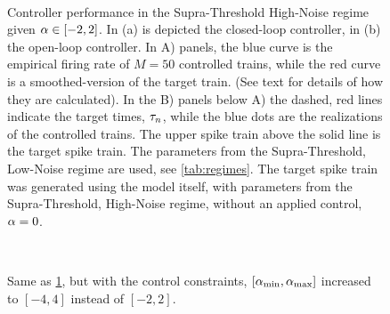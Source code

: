 \begin{figure}[htp]
\begin{center}
  \\ 
\caption[Controller simulations for Supra-Threshold High-Noise
regime]{Controller performance in the Supra-Threshold High-Noise regime given $\alpha \in [-2,2]$. 
  In (a) is depicted the closed-loop controller, in (b) the open-loop
  controller.
  In A) panels, the blue curve is the empirical firing
  rate of $M=50$ controlled trains, while the red curve is a
  smoothed-version of the target train. 
  (See text for details of how they are calculated). 
  In the B) panels below A) the dashed, red lines indicate the target times,
  ${\tau}_n$, while the blue dots are the realizations of the controlled trains.  
  The upper spike train above the solid line is the target spike train.
  The parameters from the Supra-Threshold, Low-Noise regime are used, see \cref{tab:regimes}. 
  The target spike train was generated
  using the model itself, with parameters from the Supra-Threshold, High-Noise regime, without an applied
  control, $\alpha=0$.
}
  \label{fig:targettrain_highnoise}     
\end{center}
\end{figure}

\begin{figure}[htp]
\begin{center}
\\
 \caption[Controller simulations for Supra-Threshold High-Noise regime with
 relaxed control-constraints] {Same as \cref{fig:targettrain_highnoise}, but with the control
  constraints, $[{ \alpha_{\textrm{min}} }, { \alpha_{\textrm{max}} }]$ increased to $[-4,4]$ instead of $[-2,2]$.}
  \label{fig:targettrain_cl_highnoise_aplus}     
\end{center}
\end{figure} 

